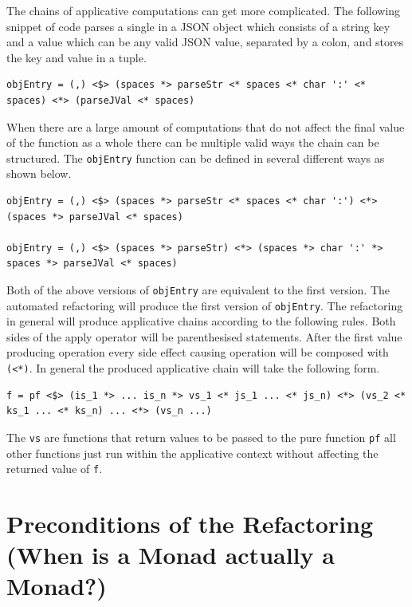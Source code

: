 The chains of applicative computations can get more complicated. The following snippet of code parses a single in a JSON object which consists of a string key and a value which can be any valid JSON value, separated by a colon, and stores the key and value in a tuple. 

\begin{lstlisting}[frame=tblr]
objEntry = (,) <$> (spaces *> parseStr <* spaces <* char ':' <* spaces) <*> (parseJVal <* spaces)
\end{lstlisting}

When there are a large amount of computations that do not affect the final value of the function as a whole there can be multiple valid ways the chain can be structured. The \texttt{objEntry} function can be defined in several different ways as shown below.

\begin{lstlisting}[frame=tblr]
objEntry = (,) <$> (spaces *> parseStr <* spaces <* char ':') <*> (spaces *> parseJVal <* spaces)

objEntry = (,) <$> (spaces *> parseStr) <*> (spaces *> char ':' *> spaces *> parseJVal <* spaces)
\end{lstlisting}

Both of the above versions of \texttt{objEntry} are equivalent to the first version. The automated refactoring will produce the first version of \texttt{objEntry}. The refactoring in general will produce applicative chains according to the following rules. Both sides of the apply operator will be parenthesised statements. After the first value producing operation every side effect causing operation will be composed with \texttt{(<*)}. In general the produced applicative chain will take the following form.

\begin{lstlisting}[frame=tblr]
f = pf <$> (is_1 *> ... is_n *> vs_1 <* js_1 ... <* js_n) <*> (vs_2 <* ks_1 ... <* ks_n) ... <*> (vs_n ...)
\end{lstlisting}

The \texttt{vs} are functions that return values to be passed to the pure function \texttt{pf} all other functions just run within the applicative context without affecting the returned value of \texttt{f}.

\section{Preconditions of the Refactoring (When is a Monad actually a Monad?)}
\label{sec:appPrecons}

